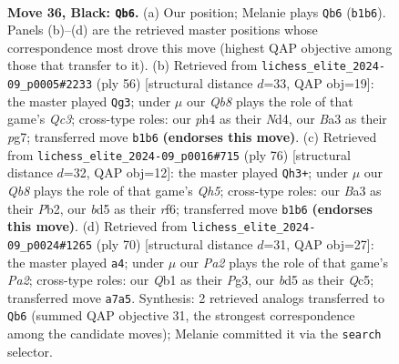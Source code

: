 \documentclass[11pt]{article}
\begin{document}
\clearpage

\begin{figure}[p]\centering
\begin{subfigure}{0.46\textwidth}\centering
\resizebox{\linewidth}{!}{%
\newchessgame
\chessboard[
  setfen={8/pp4kp/6p1/3BR3/7P/b5P1/5PK1/1q6 b - - 0 36},
  showmover=false,
  pgfstyle=straightmove, color=movearrow, markmove={b1-b6}
]}
\caption{}
\end{subfigure}\hfill
\begin{subfigure}{0.46\textwidth}\centering
\resizebox{\linewidth}{!}{%
\newchessgame
\chessboard[
  setfen={4r1k1/3r1pp1/7p/3bP3/3N4/2Q4P/5PPK/8 w - - 2 29},
  showmover=false,
  pgfstyle=straightmove, color=movearrow, markmove={c3-g3}
]}
\caption{}
\end{subfigure}
\\[4pt]
\begin{subfigure}{0.46\textwidth}\centering
\resizebox{\linewidth}{!}{%
\newchessgame
\chessboard[
  setfen={3r4/p7/1p2kr2/3p3Q/8/4P3/PP3PKP/8 w - - 14 39},
  showmover=false,
  pgfstyle=straightmove, color=movearrow, markmove={h5-h3}
]}
\caption{}
\end{subfigure}\hfill
\begin{subfigure}{0.46\textwidth}\centering
\resizebox{\linewidth}{!}{%
\newchessgame
\chessboard[
  setfen={3n4/5k1p/5bp1/2Q5/7P/2p3P1/P4P2/6K1 w - - 1 36},
  showmover=false,
  pgfstyle=straightmove, color=movearrow, markmove={a2-a4}
]}
\caption{}
\end{subfigure}
\caption{\textbf{Move 36, Black: \texttt{Qb6}.} (a) Our position; Melanie plays \texttt{Qb6} (\texttt{b1b6}). Panels (b)--(d) are the retrieved master positions whose correspondence most drove this move (highest QAP objective among those that transfer to it). (b) Retrieved from \texttt{lichess\_elite\_2024-09\_p0005\#2233} (ply 56) [structural distance $d$=33, QAP obj=19]: the master played \texttt{Qg3}; under $\mu$ our \emph{Qb8} plays the role of that game's \emph{Qc3}; cross-type roles: our \emph{p}h4 as their \emph{N}d4, our \emph{B}a3 as their \emph{p}g7; transferred move \texttt{b1b6} \textbf{(endorses this move)}. (c) Retrieved from \texttt{lichess\_elite\_2024-09\_p0016\#715} (ply 76) [structural distance $d$=32, QAP obj=12]: the master played \texttt{Qh3+}; under $\mu$ our \emph{Qb8} plays the role of that game's \emph{Qh5}; cross-type roles: our \emph{B}a3 as their \emph{P}b2, our \emph{b}d5 as their \emph{r}f6; transferred move \texttt{b1b6} \textbf{(endorses this move)}. (d) Retrieved from \texttt{lichess\_elite\_2024-09\_p0024\#1265} (ply 70) [structural distance $d$=31, QAP obj=27]: the master played \texttt{a4}; under $\mu$ our \emph{Pa2} plays the role of that game's \emph{Pa2}; cross-type roles: our \emph{Q}b1 as their \emph{P}g3, our \emph{b}d5 as their \emph{Q}c5; transferred move \texttt{a7a5}. Synthesis: 2 retrieved analogs transferred to \texttt{Qb6} (summed QAP objective 31, the strongest correspondence among the candidate moves); Melanie committed it via the \texttt{search} selector.}
\label{fig:thought-m71}
\end{figure}
\end{document}

